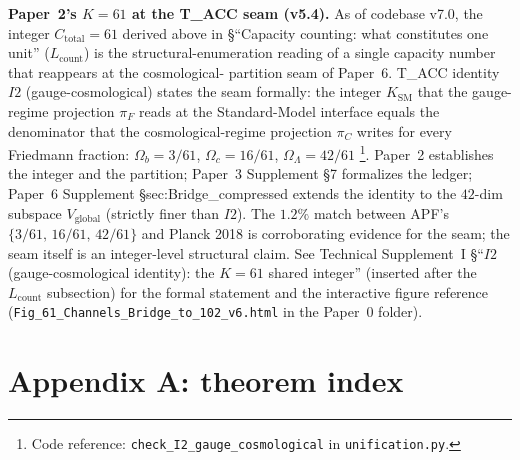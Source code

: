 \documentclass[11pt]{article}
\newcommand{\coderef}[2]{\footnote{Code reference: \texttt{#1} in \texttt{#2}.}}
\begin{document}
\smallskip\noindent\textbf{Paper~2's $K = 61$ at the T\_ACC seam
(v5.4).}
As of codebase v7.0, the integer $C_{\mathrm{total}} = 61$ derived
above in \S``Capacity counting: what constitutes one unit''
($L_{\mathrm{count}}$) is the structural-enumeration
reading of a single capacity number that reappears at the cosmological-
partition seam of Paper~6.  T\_ACC identity $I2$ (gauge-cosmological)
states the seam formally: the integer $K_{\mathrm{SM}}$ that the
gauge-regime projection $\pi_F$ reads at the Standard-Model interface
equals the denominator that the cosmological-regime projection
$\pi_C$ writes for every Friedmann fraction:
$\Omega_b = 3/61$, $\Omega_c = 16/61$, $\Omega_\Lambda = 42/61$
\coderef{check\_I2\_gauge\_cosmological}{unification.py}.  Paper~2
establishes the integer and the partition; Paper~3 Supplement \S 7
formalizes the ledger; Paper~6 Supplement \S sec:Bridge\_compressed
extends the identity to the $42$-dim subspace $V_{\mathrm{global}}$
(strictly finer than $I2$).  The $1.2\%$ match between APF's
$\{3/61,\,16/61,\,42/61\}$ and Planck 2018 is corroborating evidence
for the seam; the seam itself is an integer-level structural claim.
See Technical Supplement~I \S``$I2$ (gauge-cosmological identity):
the $K = 61$ shared integer'' (inserted after the $L_{\mathrm{count}}$
subsection) for the formal statement and the interactive figure
reference (\texttt{Fig\_61\_Channels\_Bridge\_to\_102\_v6.html} in
the Paper~0 folder).


\section{Appendix A: theorem index}
\label{app:theorems}
\end{document}
